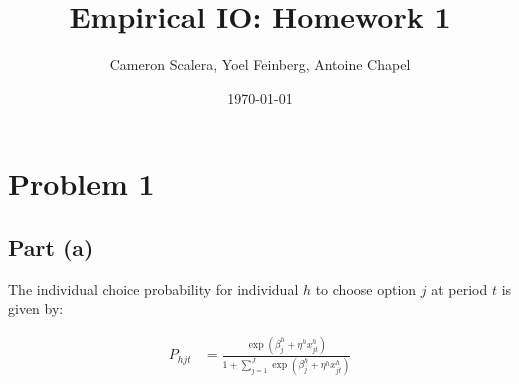\documentclass[12pt]{article}
\title{Empirical IO: Homework 1}
\author{Cameron Scalera, Yoel Feinberg, Antoine Chapel}
\date{\today}
\theoremstyle{plain}
\begin{document}
\maketitle

\section*{Problem 1}
\subsection*{Part (a)}

The individual choice probability for individual $h$ to choose option $j$ at
period $t$ is given by:

\begin{align*}
  P_{hjt} &= \frac{\exp(\beta_j^h + \eta^h x_{jt}^h)}{1 + \sum_{j=1}^J \exp(\beta_j^h + \eta^h x_{jt}^h)} \\
\end{align*}
\end{document}
